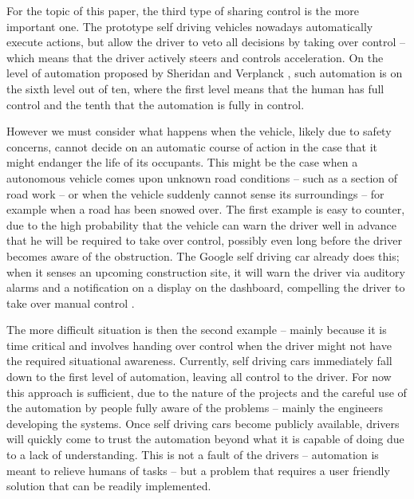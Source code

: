 \documentclass{acm_proc_article-sp}
\begin{document}
For the topic of this paper, the third type of sharing control is the more important one.
The prototype self driving vehicles nowadays automatically execute actions, but allow the driver to veto all decisions by taking over control – which means that the driver actively steers and controls acceleration.
On the level of automation proposed by Sheridan and Verplanck \cite{sheridan:human}, such automation is on the sixth level out of ten, where the first level means that the human has full control and the tenth that the automation is fully in control.

However we must consider what happens when the vehicle, likely due to safety concerns, cannot decide on an automatic course of action in the case that it might endanger the life of its occupants.
This might be the case when a autonomous vehicle comes upon unknown road conditions – such as a section of road work – or when the vehicle suddenly cannot sense its surroundings – for example when a road has been snowed over.
The first example is easy to counter, due to the high probability that the vehicle can warn the driver well in advance that he will be required to take over control, possibly even long before the driver becomes aware of the obstruction.
The Google self driving car already does this; when it senses an upcoming construction site, it will warn the driver via auditory alarms and a notification on a display on the dashboard, compelling the driver to take over manual control \cite{www:newyorker_google_car}.

The more difficult situation is then the second example – mainly because it is time critical and involves handing over control when the driver might not have the required situational awareness.
Currently, self driving cars immediately fall down to the first level of automation, leaving all control to the driver.
For now this approach is sufficient, due to the nature of the projects and the careful use of the automation by people fully aware of the problems – mainly the engineers developing the systems.
Once self driving cars become publicly available, drivers will quickly come to trust the automation beyond what it is capable of doing due to a lack of understanding.
This is not a fault of the drivers – automation is meant to relieve humans of tasks – but a problem that requires a user friendly solution that can be readily implemented.
\end{document}
